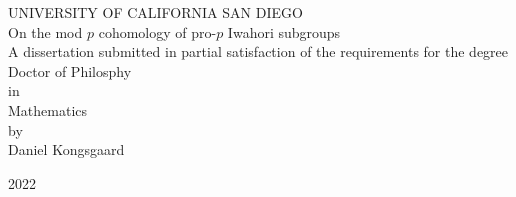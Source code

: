 \hypersetup{pageanchor=false}
\begin{titlingpage}
  {
    \centering
    {\Large UNIVERSITY OF CALIFORNIA SAN DIEGO} \\[2em]
    {\Large On the mod \texorpdfstring{$p$}{p} cohomology of pro-\texorpdfstring{$p$}{p} Iwahori subgroups} \\[2em]
    {\Large A dissertation submitted in partial satisfaction of the requirements for the degree Doctor of Philosphy} \\[2em]
    {\Large in} \\[2em]
    {\Large Mathematics} \\[2em]
    {\Large by} \\[2em]
    {\Large Daniel Kongsgaard} \\[2.5em]
  }

  \vfill

  \begin{center}
    \Large 2022
  \end{center}
\end{titlingpage}
\hypersetup{pageanchor=true}

